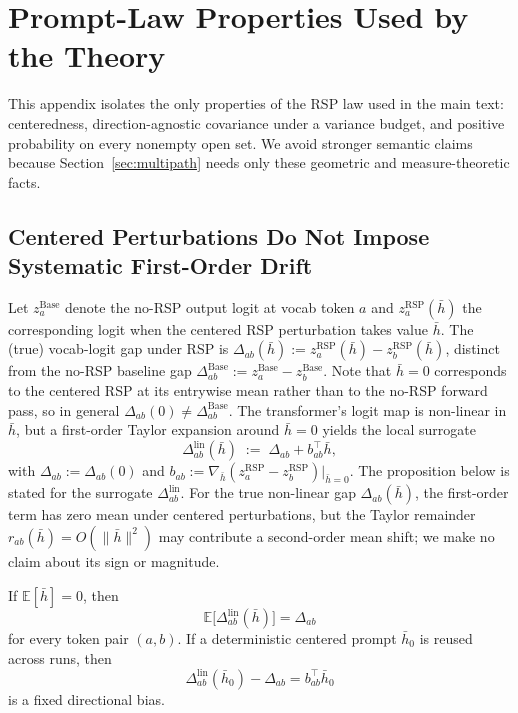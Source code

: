 \section{Prompt-Law Properties Used by the Theory}\label{app:why_random}

This appendix isolates the only properties of the RSP law used in the main text: centeredness, direction-agnostic covariance under a variance budget, and positive probability on every nonempty open set. We avoid stronger semantic claims because Section~\ref{sec:multipath} needs only these geometric and measure-theoretic facts.

\subsection{Centered Perturbations Do Not Impose Systematic First-Order Drift}

Let $z^{\text{Base}}_a$ denote the no-RSP output logit at vocab token $a$ and $z^{\text{RSP}}_a(\bar h)$ the corresponding logit when the centered RSP perturbation takes value $\bar h$. The (true) vocab-logit gap under RSP is $\Delta_{ab}(\bar h) := z^{\text{RSP}}_a(\bar h) - z^{\text{RSP}}_b(\bar h)$, distinct from the no-RSP baseline gap $\Delta^{\text{Base}}_{ab} := z^{\text{Base}}_a - z^{\text{Base}}_b$. Note that $\bar h = 0$ corresponds to the centered RSP at its entrywise mean rather than to the no-RSP forward pass, so in general $\Delta_{ab}(0) \ne \Delta^{\text{Base}}_{ab}$. The transformer's logit map is non-linear in $\bar h$, but a first-order Taylor expansion around $\bar h = 0$ yields the local surrogate
\[
\Delta_{ab}^{\mathrm{lin}}(\bar{h}) \;:=\; \Delta_{ab} + b_{ab}^\top \bar{h},
\]
with $\Delta_{ab} := \Delta_{ab}(0)$ and $b_{ab} := \nabla_{\bar h}(z^{\text{RSP}}_a - z^{\text{RSP}}_b)|_{\bar h = 0}$. The proposition below is stated for the surrogate $\Delta_{ab}^{\mathrm{lin}}$. For the true non-linear gap $\Delta_{ab}(\bar h)$, the first-order term has zero mean under centered perturbations, but the Taylor remainder $r_{ab}(\bar h) = O(\|\bar h\|^2)$ may contribute a second-order mean shift; we make no claim about its sign or magnitude.

\begin{proposition}\label{prop:centered_no_drift}
If $\mathbb{E}[\bar{h}] = 0$, then
\[
\mathbb{E}\big[\Delta_{ab}^{\mathrm{lin}}(\bar{h})\big] = \Delta_{ab}
\]
for every token pair $(a,b)$. If a deterministic centered prompt $\bar h_0$ is reused across runs, then
\[
\Delta_{ab}^{\mathrm{lin}}(\bar h_0) - \Delta_{ab} = b_{ab}^\top \bar h_0
\]
is a fixed directional bias.
\end{proposition}

